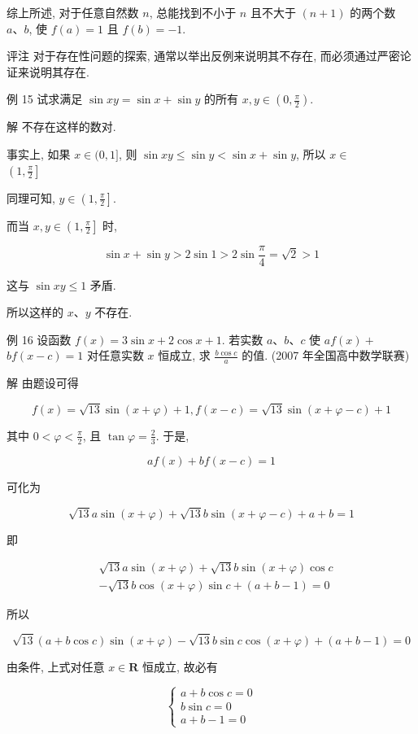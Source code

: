 	综上所述, 对于任意自然数 $n$, 总能找到不小于 $n$ 且不大于 $(n+1)$ 的两个数 $a 、 b$, 使 $f(a)=1$ 且 $f(b)=-1$.

	评注 对于存在性问题的探索, 通常以举出反例来说明其不存在, 而必须通过严密论证来说明其存在.

	例 15 试求满足 $\sin x y=\sin x+\sin y$ 的所有 $x, y \in\left(0, \frac{\pi}{2}\right)$.

	解 不存在这样的数对.

	事实上, 如果 $x \in(0,1]$, 则 $\sin x y \leqslant \sin y<\sin x+\sin y$, 所以 $x \in$\\
$\left(1, \frac{\pi}{2}\right]$

	同理可知, $y \in\left(1, \frac{\pi}{2}\right]$.

	而当 $x, y \in\left(1, \frac{\pi}{2}\right]$ 时,

	$$
		\sin x+\sin y>2 \sin 1>2 \sin \frac{\pi}{4}=\sqrt{2}>1
	$$

	这与 $\sin x y \leqslant 1$ 矛盾.

	所以这样的 $x 、 y$ 不存在.

	例 16 设函数 $f(x)=3 \sin x+2 \cos x+1$. 若实数 $a 、 b 、 c$ 使 $a f(x)+$ $b f(x-c)=1$ 对任意实数 $x$ 恒成立, 求 $\frac{b \cos c}{a}$ 的值. (2007 年全国高中数学联赛)

	解 由题设可得

	$$
		f(x)=\sqrt{13} \sin (x+\varphi)+1, f(x-c)=\sqrt{13} \sin (x+\varphi-c)+1
	$$

	其中 $0<\varphi<\frac{\pi}{2}$, 且 $\tan \varphi=\frac{2}{3}$. 于是,

	$$
		a f(x)+b f(x-c)=1
	$$

	可化为

	$$
		\sqrt{13} a \sin (x+\varphi)+\sqrt{13} b \sin (x+\varphi-c)+a+b=1
	$$

	即

	$$
		\begin{aligned}
			 & \sqrt{13} a \sin (x+\varphi)+\sqrt{13} b \sin (x+\varphi) \cos c \\
			 & -\sqrt{13} b \cos (x+\varphi) \sin c+(a+b-1)=0
		\end{aligned}
	$$

	所以

	$$
		\sqrt{13}(a+b \cos c) \sin (x+\varphi)-\sqrt{13} b \sin c \cos (x+\varphi)+(a+b-1)=0
	$$

	由条件, 上式对任意 $x \in \mathbf{R}$ 恒成立, 故必有

	\[
		\left\{\begin{array}{l}
			a+b \cos c=0  \tag{1} \\
			b \sin c=0            \\
			a+b-1=0
		\end{array}\right.
	\]

